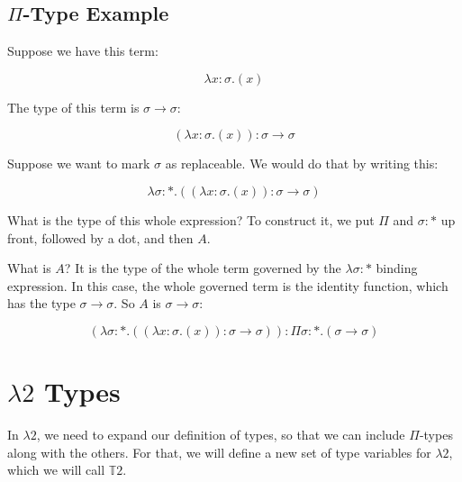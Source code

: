 \documentclass{book}
\numberwithin{equation}{chapter}
\begin{document}
\section{$\Pi$-Type Example}

Suppose we have this term:

\begin{equation}
\lambda x : \sigma.(x)
\end{equation}

\noindent
The type of this term is $\sigma \rightarrow \sigma$:

\begin{equation}
(\lambda x : \sigma.(x)) : \sigma \rightarrow \sigma
\end{equation}

\noindent
Suppose we want to mark $\sigma$ as replaceable. We would do that by writing this:

\begin{equation}
\lambda \sigma : *.((\lambda x : \sigma.(x)) : \sigma \rightarrow \sigma)
\end{equation}

\noindent
What is the type of this whole expression? To construct it, we put $\Pi$ and $\sigma : *$ up front, followed by a dot, and then $A$.

What is $A$? It is the type of the whole term governed by the $\lambda \sigma : *$ binding expression. In this case, the whole governed term is the identity function, which has the type $\sigma \rightarrow \sigma$. So $A$ is $\sigma \rightarrow \sigma$:

\begin{equation}
(\lambda \sigma : *.((\lambda x : \sigma.(x)) : \sigma \rightarrow \sigma)) : \Pi \sigma : *.(\sigma \rightarrow \sigma)
\end{equation}


\chapter{$\lambda 2$ Types}

In $\lambda 2$, we need to expand our definition of types, so that we can include $\Pi$-types along with the others. For that, we will define a new set of type variables for $\lambda 2$, which we will call $\mathbb{T}2$.
\end{document}
